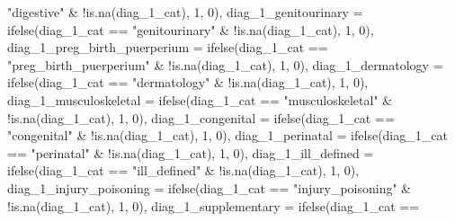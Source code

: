 \documentclass[
]{article}
\newenvironment{Shaded}{\begin{snugshade}}{\end{snugshade}}
\newcommand{\AttributeTok}[1]{\textcolor[rgb]{0.77,0.63,0.00}{#1}}
\newcommand{\DecValTok}[1]{\textcolor[rgb]{0.00,0.00,0.81}{#1}}
\newcommand{\FunctionTok}[1]{\textcolor[rgb]{0.00,0.00,0.00}{#1}}
\newcommand{\NormalTok}[1]{#1}
\newcommand{\SpecialCharTok}[1]{\textcolor[rgb]{0.00,0.00,0.00}{#1}}
\newcommand{\StringTok}[1]{\textcolor[rgb]{0.31,0.60,0.02}{#1}}
\begin{document}
\begin{Shaded}
\begin{Highlighting}[]
            \StringTok{"digestive"} \SpecialCharTok{\&} \SpecialCharTok{!}\FunctionTok{is.na}\NormalTok{(diag\_1\_cat), }\DecValTok{1}\NormalTok{, }\DecValTok{0}\NormalTok{),}
        \AttributeTok{diag\_1\_genitourinary =} \FunctionTok{ifelse}\NormalTok{(diag\_1\_cat }\SpecialCharTok{==}
            \StringTok{"genitourinary"} \SpecialCharTok{\&} \SpecialCharTok{!}\FunctionTok{is.na}\NormalTok{(diag\_1\_cat), }\DecValTok{1}\NormalTok{,}
            \DecValTok{0}\NormalTok{), }\AttributeTok{diag\_1\_preg\_birth\_puerperium =} \FunctionTok{ifelse}\NormalTok{(diag\_1\_cat }\SpecialCharTok{==}
            \StringTok{"preg\_birth\_puerperium"} \SpecialCharTok{\&} \SpecialCharTok{!}\FunctionTok{is.na}\NormalTok{(diag\_1\_cat),}
            \DecValTok{1}\NormalTok{, }\DecValTok{0}\NormalTok{), }\AttributeTok{diag\_1\_dermatology =} \FunctionTok{ifelse}\NormalTok{(diag\_1\_cat }\SpecialCharTok{==}
            \StringTok{"dermatology"} \SpecialCharTok{\&} \SpecialCharTok{!}\FunctionTok{is.na}\NormalTok{(diag\_1\_cat), }\DecValTok{1}\NormalTok{,}
            \DecValTok{0}\NormalTok{), }\AttributeTok{diag\_1\_musculoskeletal =} \FunctionTok{ifelse}\NormalTok{(diag\_1\_cat }\SpecialCharTok{==}
            \StringTok{"musculoskeletal"} \SpecialCharTok{\&} \SpecialCharTok{!}\FunctionTok{is.na}\NormalTok{(diag\_1\_cat),}
            \DecValTok{1}\NormalTok{, }\DecValTok{0}\NormalTok{), }\AttributeTok{diag\_1\_congenital =} \FunctionTok{ifelse}\NormalTok{(diag\_1\_cat }\SpecialCharTok{==}
            \StringTok{"congenital"} \SpecialCharTok{\&} \SpecialCharTok{!}\FunctionTok{is.na}\NormalTok{(diag\_1\_cat), }\DecValTok{1}\NormalTok{, }\DecValTok{0}\NormalTok{),}
        \AttributeTok{diag\_1\_perinatal =} \FunctionTok{ifelse}\NormalTok{(diag\_1\_cat }\SpecialCharTok{==} \StringTok{"perinatal"} \SpecialCharTok{\&}
            \SpecialCharTok{!}\FunctionTok{is.na}\NormalTok{(diag\_1\_cat), }\DecValTok{1}\NormalTok{, }\DecValTok{0}\NormalTok{), }\AttributeTok{diag\_1\_ill\_defined =} \FunctionTok{ifelse}\NormalTok{(diag\_1\_cat }\SpecialCharTok{==}
            \StringTok{"ill\_defined"} \SpecialCharTok{\&} \SpecialCharTok{!}\FunctionTok{is.na}\NormalTok{(diag\_1\_cat), }\DecValTok{1}\NormalTok{,}
            \DecValTok{0}\NormalTok{), }\AttributeTok{diag\_1\_injury\_poisoning =} \FunctionTok{ifelse}\NormalTok{(diag\_1\_cat }\SpecialCharTok{==}
            \StringTok{"injury\_poisoning"} \SpecialCharTok{\&} \SpecialCharTok{!}\FunctionTok{is.na}\NormalTok{(diag\_1\_cat),}
            \DecValTok{1}\NormalTok{, }\DecValTok{0}\NormalTok{), }\AttributeTok{diag\_1\_supplementary =} \FunctionTok{ifelse}\NormalTok{(diag\_1\_cat }\SpecialCharTok{==}

\end{Highlighting}
\end{Shaded}
\end{document}
